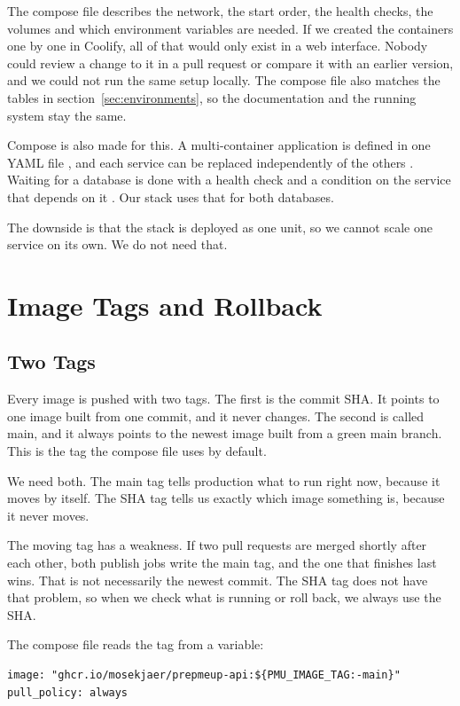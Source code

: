 \documentclass[a4paper,11pt]{article}
\begin{document}
The compose file describes the network, the start order, the health checks, the volumes and which environment variables are needed. If we created the containers one by one in Coolify, all of that would only exist in a web interface. Nobody could review a change to it in a pull request or compare it with an earlier version, and we could not run the same setup locally. The compose file also matches the tables in section~\ref{sec:environments}, so the documentation and the running system stay the same.

Compose is also made for this. A multi-container application is defined in one YAML file \cite{docker-compose-overview}, and each service can be replaced independently of the others \cite{docker-compose-services}. Waiting for a database is done with a health check and a condition on the service that depends on it \cite{docker-compose-startup-order}. Our stack uses that for both databases.

The downside is that the stack is deployed as one unit, so we cannot scale one service on its own. We do not need that.

\section{Image Tags and Rollback}\label{sec:rollback}
\subsection{Two Tags}
Every image is pushed with two tags. The first is the commit SHA. It points to one image built from one commit, and it never changes. The second is called main, and it always points to the newest image built from a green main branch. This is the tag the compose file uses by default.

We need both. The main tag tells production what to run right now, because it moves by itself. The SHA tag tells us exactly which image something is, because it never moves.

The moving tag has a weakness. If two pull requests are merged shortly after each other, both publish jobs write the main tag, and the one that finishes last wins. That is not necessarily the newest commit. The SHA tag does not have that problem, so when we check what is running or roll back, we always use the SHA.

The compose file reads the tag from a variable:

\begin{lstlisting}
image: "ghcr.io/mosekjaer/prepmeup-api:${PMU_IMAGE_TAG:-main}"
pull_policy: always
\end{lstlisting}
\end{document}
